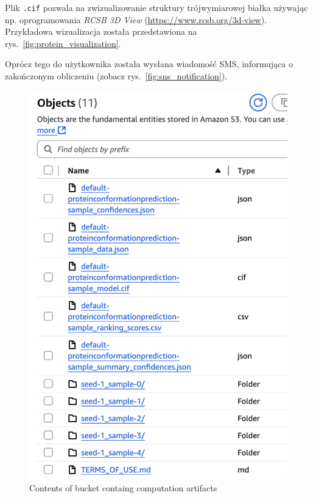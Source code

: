 Plik \texttt{.cif} pozwala na zwizualizowanie struktury trójwymiarowej białka używając np. oprogramowania \textit{RCSB 3D View} (\url{https://www.rcsb.org/3d-view}).
Przykładowa wizualizacja została przedstawiona na rys.~\ref{fig:protein_visualization}.

Oprócz tego do użytkownika została wysłana wiadomość SMS, informująca o zakończonym obliczeniu (zobacz rys.~\ref{fig:sns_notification}).

\begin{figure}[htbp]
    \centering
    \includegraphics[width=\textwidth]{images/bucket2}
    \caption{Contents of bucket containg computation artifacts}
    \label{fig:bucket}
\end{figure}

